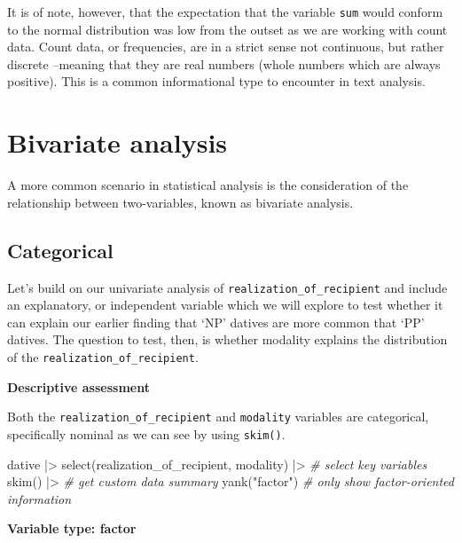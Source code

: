 \documentclass[
  letterpaper,
]{scrbook}
\newenvironment{Shaded}{\begin{snugshade}}{\end{snugshade}}
\newcommand{\CommentTok}[1]{\textcolor[rgb]{0.00,0.00,0.00}{\textit{#1}}}
\newcommand{\FunctionTok}[1]{\textcolor[rgb]{0.00,0.00,0.00}{#1}}
\newcommand{\NormalTok}[1]{\textcolor[rgb]{0.00,0.00,0.00}{#1}}
\newcommand{\SpecialCharTok}[1]{\textcolor[rgb]{0.00,0.00,0.00}{#1}}
\newcommand{\StringTok}[1]{\textcolor[rgb]{0.00,0.00,0.00}{#1}}
\begin{document}
It is of note, however, that the expectation that the variable
\texttt{sum} would conform to the normal distribution was low from the
outset as we are working with count data. Count data, or frequencies,
are in a strict sense not continuous, but rather discrete --meaning that
they are real numbers (whole numbers which are always positive). This is
a common informational type to encounter in text analysis.

\hypertarget{bivariate-analysis}{%
\section{Bivariate analysis}\label{bivariate-analysis}}

A more common scenario in statistical analysis is the consideration of
the relationship between two-variables, known as bivariate analysis.

\hypertarget{categorical-1}{%
\subsection{Categorical}\label{categorical-1}}

Let's build on our univariate analysis of
\texttt{realization\_of\_recipient} and include an explanatory, or
independent variable which we will explore to test whether it can
explain our earlier finding that `NP' datives are more common that `PP'
datives. The question to test, then, is whether modality explains the
distribution of the \texttt{realization\_of\_recipient}.

\textbf{Descriptive assessment}

Both the \texttt{realization\_of\_recipient} and \texttt{modality}
variables are categorical, specifically nominal as we can see by using
\texttt{skim()}.

\begin{Shaded}
\begin{Highlighting}[]
\NormalTok{dative }\SpecialCharTok{|\textgreater{}} 
  \FunctionTok{select}\NormalTok{(realization\_of\_recipient, modality) }\SpecialCharTok{|\textgreater{}} \CommentTok{\# select key variables}
  \FunctionTok{skim}\NormalTok{() }\SpecialCharTok{|\textgreater{}} \CommentTok{\# get custom data summary}
  \FunctionTok{yank}\NormalTok{(}\StringTok{"factor"}\NormalTok{) }\CommentTok{\# only show factor{-}oriented information}
\end{Highlighting}
\end{Shaded}

\textbf{Variable type: factor}
\end{document}
